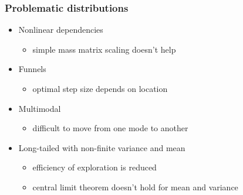 \documentclass[10pt,handout]{beamer}
\begin{document}
\begin{frame}
\begin{itemize}
  \end{itemize}
\end{frame}

\begin{frame}

\frametitle{Problematic distributions}

  \begin{itemize}
  \item<1-> Nonlinear dependencies
    \begin{itemize}
    \item simple mass matrix scaling doesn't help
    \end{itemize}
  \item<2-> Funnels
    \begin{itemize}
    \item optimal step size depends on location
    \end{itemize}
  \item<3-> Multimodal
    \begin{itemize}
    \item difficult to move from one mode to another
    \end{itemize}
  \item<4-> Long-tailed with non-finite variance and mean
    \begin{itemize}
    \item efficiency of exploration is reduced
    \item central limit theorem doesn't hold for mean and variance
    \end{itemize}
  \end{itemize}

\end{frame}
\end{document}
